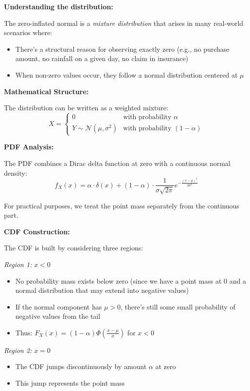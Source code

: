 \documentclass[12pt]{article}
\begin{document}
\begin{explanation}
\textbf{Understanding the distribution:}

The zero-inflated normal is a \textit{mixture distribution} that arises in many real-world scenarios where:
\begin{itemize}
    \item There's a structural reason for observing exactly zero (e.g., no purchase amount, no rainfall on a given day, no claim in insurance)
    \item When non-zero values occur, they follow a normal distribution centered at \(\mu\)
\end{itemize}

\textbf{Mathematical Structure:}

The distribution can be written as a weighted mixture:
\[
X = \begin{cases}
0 & \text{with probability } \alpha \\
Y \sim \mathcal{N}(\mu, \sigma^2) & \text{with probability } (1-\alpha)
\end{cases}
\]

\textbf{PDF Analysis:}

The PDF combines a Dirac delta function at zero with a continuous normal density:
\[
f_X(x) = \alpha \cdot \delta(x) + (1-\alpha) \cdot \frac{1}{\sigma\sqrt{2\pi}} e^{-\frac{(x-\mu)^2}{2\sigma^2}}
\]

For practical purposes, we treat the point mass separately from the continuous part.

\textbf{CDF Construction:}

The CDF is built by considering three regions:

\textit{Region 1: } \(x < 0\)
\begin{itemize}
    \item No probability mass exists below zero (since we have a point mass at 0 and a normal distribution that may extend into negative values)
    \item If the normal component has \(\mu > 0\), there's still some small probability of negative values from the tail
    \item Thus: \(F_X(x) = (1-\alpha) \Phi\left(\frac{x-\mu}{\sigma}\right)\) for \(x < 0\)
\end{itemize}

\textit{Region 2: } \(x = 0\)
\begin{itemize}
    \item The CDF jumps discontinuously by amount \(\alpha\) at zero
    \item This jump represents the point mass
\end{itemize}


\end{explanation}
\end{document}
